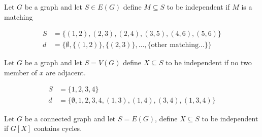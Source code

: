				\begin{example}
					Let $G$ be a graph and let $S \in E(G)$ define $M\subseteq S$ to be independent if $M$ is a matching
				\end{example}

				\begin{figure}
					\centering
				\end{figure}

				\begin{align}
					S &= \{(1, 2), (2, 3), (2, 4), (3, 5), (4, 6), (5, 6)\} \\
					d &= \{\emptyset, \{(1, 2)\}, \{(2, 3)\}, ... , \{\text{other matching...}\}\}
				\end{align}

				\begin{example}
					Let $G$ be a graph and let $S = V(G)$ define $X \subseteq S$ to be independent if no two member of $x$ are adjacent.
				\end{example}

				\begin{figure}
					\centering
				\end{figure}

				\begin{align}
					S &= \{1, 2, 3, 4\} \\
					d &= \{\emptyset, 1, 2, 3, 4, (1, 3), (1, 4), (3, 4), (1, 3, 4)\}
				\end{align}

				\begin{example}
					Let $G$ be a connected graph and let $S = E(G)$, define $X \subseteq S$ to be independent if $G[X]$ contains cycles.
				\end{example}

